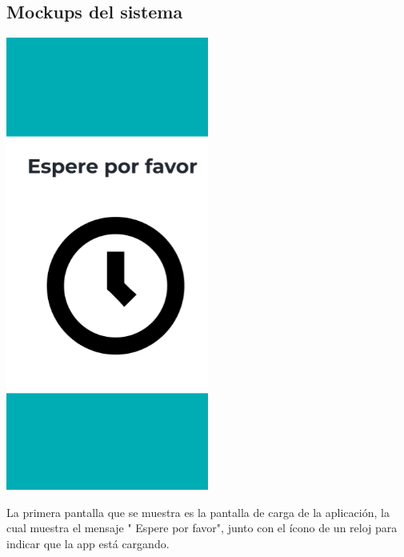 \subsection{Mockups del sistema}
\begin{center}
    \includegraphics[width=0.5\textwidth]{Images/Cap 3/Pantalla1.png}
\end{center}

La primera pantalla que se muestra es la pantalla de carga de la aplicación, la cual muestra el mensaje " Espere por favor", junto con el ícono de un reloj para indicar que la app está cargando.

